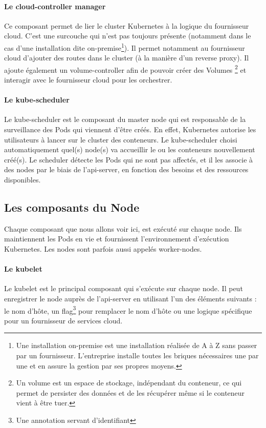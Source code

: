 \documentclass[11pt,fleqn]{book} %
\begin{document}
\paragraph{Le cloud-controller manager}
Ce composant permet de lier le cluster Kubernetes à la logique du fournisseur cloud. C'est une surcouche qui n'est pas toujours présente (notamment dans le cas d'une installation dite on-premise\footnote{Une installation on-premise est une installation réalisée de A à Z sans passer par un fournisseur. L'entreprise installe toutes les briques nécessaires une par une et en assure la gestion par ses propres moyens.}). Il permet notamment au fournisseur cloud d'ajouter des routes dans le cluster (à la manière d'un reverse proxy). Il ajoute également un volume-controller afin de pouvoir créer des Volumes \footnote{Un volume est un espace de stockage, indépendant du conteneur, ce qui permet de persister des données et de les récupérer même si le conteneur vient à être tuer.} et interagir avec le fournisseur cloud pour les orchestrer.

\paragraph*{Le kube-scheduler}
Le kube-scheduler est le composant du master node qui est responsable de la surveillance des Pods qui viennent d'être créés. En effet, Kubernetes autorise les utilisateurs à lancer sur le cluster des conteneurs. Le kube-scheduler choisi automatiquement quel(s) node(s) va accueillir le ou les conteneurs nouvellement créé(s). Le scheduler détecte les Pods qui ne sont pas affectés, et il les associe à des nodes par le biais de l'api-server, en fonction des besoins et des ressources disponibles.

\subsection*{Les composants du Node}
Chaque composant que nous allons voir ici, est exécuté sur chaque node. Ils maintiennent les Pods en vie et fournissent l'environnement d'exécution Kubernetes. Les nodes sont parfois aussi appelés worker-nodes.

\paragraph*{Le kubelet}
Le kubelet est le principal composant qui s'exécute sur chaque node. Il peut enregistrer le node auprès de l'api-server en utilisant l'un des éléments suivants : le nom d'hôte, un flag\footnote{Une annotation servant d'identifiant} pour remplacer le nom d'hôte ou une logique spécifique pour un fournisseur de services cloud.\\
\end{document}
